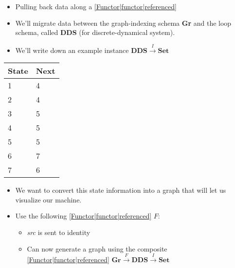 
\begin{itemize}
    \item  Pulling back data along a \ref{Functor|functor|referenced}
    \item We'll migrate data between the graph-indexing schema \textbf{Gr} and the loop schema, called \textbf{DDS} (for discrete-dynamical system).
    \item We'll write down an example instance $\mathbf{DDS}\xrightarrow{I}\mathbf{Set}$
  \end{itemize}

  \begin{minipage}{0.48\textwidth}

    \begin{tabular}{|l|l|}
      \hline
      State & Next \\ \hline
      1     & 4    \\ \hline
      2     & 4    \\ \hline
      3     & 5    \\ \hline
      4     & 5    \\ \hline
      5     & 5    \\ \hline
      6     & 7    \\ \hline
      7     & 6    \\ \hline
    \end{tabular}
  \end{minipage}

  \begin{itemize}
    \item  We want to convert this state information into a graph that will let us visualize our machine.
    \item Use the following \ref{Functor|functor|referenced} $F$: 
          \begin{itemize}
            \item \emph{src} is sent to identity
            \item Can now generate a graph using the composite \ref{Functor|functor|referenced} $\mathbf{Gr}\xrightarrow{F}\mathbf{DDS}\xrightarrow{I}\mathbf{Set}$
          \end{itemize}
  \end{itemize}

